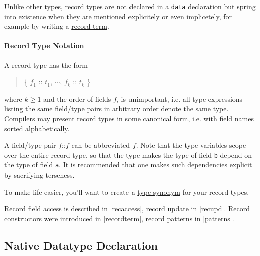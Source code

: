 Unlike other types, record types are not declared in a \texttt{data} declaration but spring into existence when they are mentioned explicitely or even implicetely, for example by writing a \hyperref[recordterm]{record term}.


\paragraph*{Record Type Notation}
A record type has the form
\begin{quote}
\{ $f_1$ :: $t_1$, $\cdots$, $f_k$ :: $t_k$ \}
\end{quote}
where $k\ge 1$ and the order of fields $f_i$ is unimportant, i.e. all type expressions listing the same field/type pairs in arbitrary order denote the same type. Compilers may present record types in some canonical form, i.e. with field names sorted alphabetically.

A field/type pair $f$::$f$ can be abbreviated $f$. Note that the type variables scope over the entire record type, so that the type  makes the type of field \texttt{b} depend on the type of field \texttt{a}.
It is recommended that one makes such dependencies explicit by sacrifying terseness.

To make life easier, you'll want to create a
\hyperref[typedcl]{type synonym} for your record types.


Record field access is described in \autoref{recaccess}, record update in \autoref{recupd}. Record constructors were introduced in \autoref{recordterm}, record patterns in \autoref{patterns}.

\subsection{Native Datatype Declaration}    \label{nativedat}

\begin{flushleft}
   \sym{=}  \\
  \oder{} 
 
  \alt {}
  \alt {}  
  \alt {}  
\end{flushleft}

